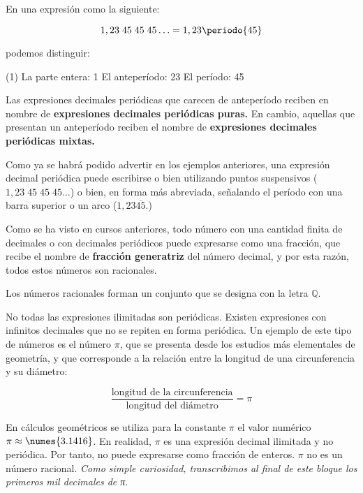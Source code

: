 En una expresión como la siguiente:

{\setlength{\abovedisplayskip}{0ex}
 \[
 1,23\;45\;45\;45\ldots = 1,23\periodo{45}
 \]}

podemos distinguir:

\begin{ejemplos1bullet}(1)
  \task La parte entera: 1
  \task El anteperíodo: 23
  \task El período: 45
\end{ejemplos1bullet}

Las expresiones decimales periódicas que carecen de anteperíodo reciben en nombre de \textbf{expresiones
decimales periódicas puras.}  En cambio, aquellas que presentan un anteperíodo reciben el nombre 
de \textbf{expresiones decimales periódicas mixtas.}

Como ya se habrá podido advertir en los ejemplos anteriores, una expresión decimal periódica puede
escribirse o bien utilizando puntos suspensivos ($1,23\;45\;45\;45\ldots$) o bien, en forma más abreviada,
señalando el período con una barra superior o un arco ($1,23\overline{45}$.)

Como se ha visto en cursos anteriores, todo número con una cantidad finita de decimales o con decimales
periódicos puede expresarse como una fracción, que recibe el nombre de \textbf{fracción generatriz} del 
número decimal, y por esta razón, todos estos números son racionales.
 
\begin{center}
Los números racionales forman un conjunto que se designa con la letra $\mathbb{Q}$.
\end{center}


No todas las expresiones ilimitadas son periódicas. Existen expresiones
con infinitos decimales que no se repiten en forma periódica. Un ejemplo de este tipo de números 
es el número $\pi$, que se presenta desde los estudios más elementales de geometría, y
que corresponde a la relación entre la longitud de una circunferencia y su
diámetro:

\vspace{-1.25ex}
\begin{equation*}
  \dfrac{\text{longitud de la circunferencia}}{\text{longitud del diámetro}} = \pi
\end{equation*}
\vspace{-1ex}

En cálculos geométricos se utiliza para la constante $\pi$  el valor numérico $\pi \approx \numes{3.1416}$.
En realidad, $\pi$ es una expresión decimal ilimitada y no periódica. Por tanto,
no puede expresarse como fracción de enteros. $\pi$ no es un número racional. \textit{Como simple curiosidad, 
transcribimos al final de este bloque los primeros mil decimales de π}.

